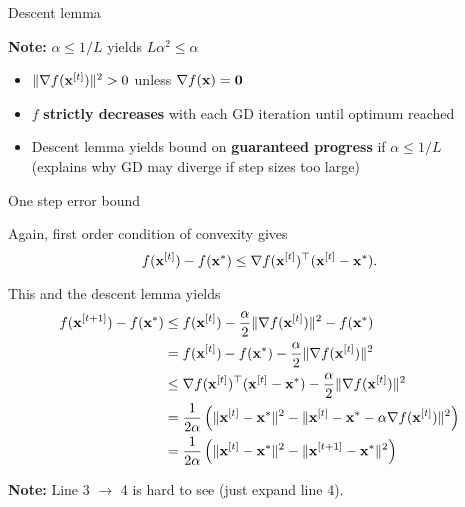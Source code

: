\documentclass[11pt,compress,t,notes=noshow, xcolor=table]{beamer}
\begin{document}
\begin{vbframe}{Descent lemma}
\begin{small}
\textbf{Note:} $\alpha \leq 1/L$ yields $L \alpha^2 \leq \alpha$


\begin{itemize}
    \item $\|\nabla f(\mathbf{x}^{[t]})\|^2 > 0$ unless $\nabla f(\mathbf{x}) = \mathbf{0}$
    \item $f$ \textbf{strictly decreases} with each GD iteration until optimum reached
    \item Descent lemma yields bound on \textbf{guaranteed progress} if $\alpha \leq 1/L$ \\
        (explains why GD may diverge if step sizes too large)
\end{itemize}
\end{small}

\end{vbframe}


\begin{vbframe}{One step error bound}

Again, first order condition of convexity gives 
$$
    f(\mathbf{x}^{[t]}) - f(\mathbf{x}^\ast) \leq  \nabla f(\mathbf{x}^{[t]})^\top (\mathbf{x}^{[t]} - \mathbf{x}^\ast).
$$

This and the descent lemma yields
\begin{align*}
    f(\mathbf{x}^{[t+1]}) - f(\mathbf{x}^\ast) &\leq f(\mathbf{x}^{[t]})  - \frac{\alpha}{2}\|\nabla f(\mathbf{x}^{[t]})\|^2  - f(\mathbf{x}^\ast) \\
    &= f(\mathbf{x}^{[t]})  - f(\mathbf{x}^\ast)  - \frac{\alpha}{2}\|\nabla f(\mathbf{x}^{[t]})\|^2 \\
    &\leq \nabla f(\mathbf{x}^{[t]})^\top (\mathbf{x}^{[t]}-\mathbf{x}^*) - \frac{\alpha}{2}\|\nabla f(\mathbf{x}^{[t]})\|^2 \\
    &= \frac{1}{2 \alpha} \left( \|\mathbf{x}^{[t]}-\mathbf{x}^\ast\|^2 - \| \mathbf{x}^{[t]} - \mathbf{x}^\ast - \alpha \nabla f(\mathbf{x}^{[t]})\|^2 \right) \\
    &= \frac{1}{2 \alpha} \left( \|\mathbf{x}^{[t]}-\mathbf{x}^\ast\|^2 - \| \mathbf{x}^{[t+1]} - \mathbf{x}^\ast \|^2 \right)
\end{align*}

\textbf{Note:} Line 3 $\to$ 4 is hard to see (just expand line 4).

\end{vbframe}
\end{document}
